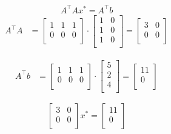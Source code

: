 \documentclass[unicode,11pt,a4paper,oneside,numbers=endperiod,openany]{scrartcl}
\begin{document}
\subsection{}
\[
    A^{\top}A x^* = A^{\top}b
\]
\begin{equation*}
    \begin{aligned}
        A^{\top}A &
        =
        \begin{bmatrix} 1 & 1 & 1 \\ 0 & 0 & 0 \\ \end{bmatrix}
        \cdot
        \begin{bmatrix} 1 & 0 \\ 1 & 0 \\ 1 & 0 \\\end{bmatrix}
        =
        \begin{bmatrix} 3 & 0 \\ 0 & 0 \\ \end{bmatrix}
    \end{aligned}
\end{equation*}

\begin{equation*}
    \begin{aligned}
        A^{\top}b &
        =
        \begin{bmatrix} 1 & 1 & 1 \\ 0 & 0 & 0 \\ \end{bmatrix}
        \cdot
        \begin{bmatrix} 5 \\ 2 \\ 4\\ \end{bmatrix}
        =
        \begin{bmatrix} 11 \\ 0 \\ \end{bmatrix}
    \end{aligned}
\end{equation*}

\[
    \begin{bmatrix} 3 & 0 \\ 0 & 0 \\ \end{bmatrix} x^*
    =
    \begin{bmatrix} 11 \\ 0 \\ \end{bmatrix}
\]
\end{document}
